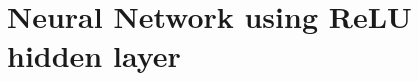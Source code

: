 \documentclass[preview]{standalone}
\begin{document}
\section{Neural Network using ReLU hidden layer}
\end{document}
